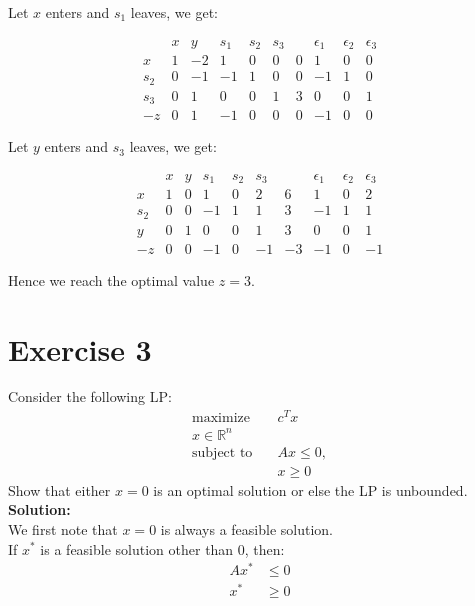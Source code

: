 \documentclass{article}
\begin{document}
Let $x$ enters and $s_1$ leaves, we get:

\[
\begin{array}{c|rrrrr|rrrrr}
 & x & y & s_1 & s_2 & s_3 & & \epsilon_1 & \epsilon_2 & \epsilon_3 \\
\hline
x & 1 & -2 & 1 & 0 & 0 & 0 & 1 & 0 & 0 \\
s_2 & 0 & -1 & -1 & 1 & 0 & 0 & -1 & 1 & 0 \\
s_3 & 0 & 1 & 0 & 0 & 1 & 3 & 0 & 0 & 1 \\
\hline
-z & 0 & 1 & -1 & 0 & 0 & 0 & -1 & 0 & 0
\end{array}
\]

Let $y$ enters and $s_3$ leaves, we get:

\[
\begin{array}{c|rrrrr|rrrrr}
 & x & y & s_1 & s_2 & s_3 & & \epsilon_1 & \epsilon_2 & \epsilon_3 \\
\hline
x & 1 & 0 & 1 & 0 & 2 & 6 & 1 & 0 & 2 \\
s_2 & 0 & 0 & -1 & 1 & 1 & 3 & -1 & 1 & 1 \\
y & 0 & 1 & 0 & 0 & 1 & 3 & 0 & 0 & 1 \\
\hline
-z & 0 & 0 & -1 & 0 & -1 & -3 & -1 & 0 & -1
\end{array}
\]

Hence we reach the optimal value $z = 3$.

\newpage

\section*{Exercise 3}
Consider the following LP:
\begin{align*}
\text{maximize} \quad & c^T x \\
x \in \mathbb{R}^n & \\
\text{subject to} \quad & Ax \leq 0, \\
& x \geq 0
\end{align*}
Show that either $x = 0$ is an optimal solution or else the LP is unbounded. \\

\textbf{Solution:} \\

We first note that $x = 0$ is always a feasible solution. \\

If $x^*$ is a feasible solution other than 0, then:
\begin{align*}
Ax^* &\leq 0 \\
x^* &\geq 0
\end{align*}
\end{document}

